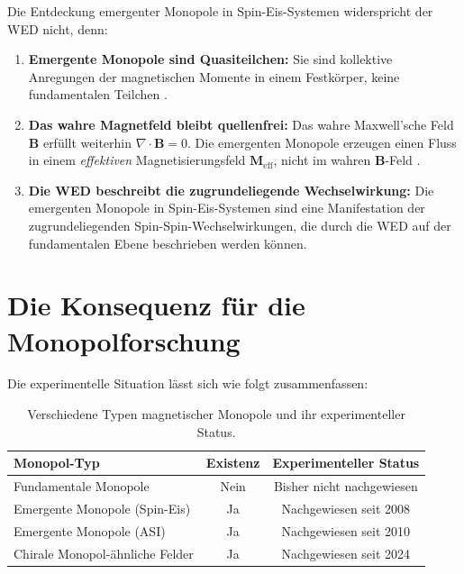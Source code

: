 Die Entdeckung emergenter Monopole in Spin-Eis-Systemen widerspricht der WED nicht, denn:

\begin{enumerate}
    \item \textbf{Emergente Monopole sind Quasiteilchen:} Sie sind kollektive Anregungen der magnetischen Momente in einem Festkörper, keine fundamentalen Teilchen \cite{Castelnovo2008}.
    
    \item \textbf{Das wahre Magnetfeld bleibt quellenfrei:} Das wahre Maxwell'sche Feld $\mathbf{B}$ erfüllt weiterhin $\nabla \cdot \mathbf{B} = 0$. Die emergenten Monopole erzeugen einen Fluss in einem \emph{effektiven} Magnetisierungsfeld $\mathbf{M}_{\text{eff}}$, nicht im wahren $\mathbf{B}$-Feld \cite{Bramwell2009}.
    
    \item \textbf{Die WED beschreibt die zugrundeliegende Wechselwirkung:} Die emergenten Monopole in Spin-Eis-Systemen sind eine Manifestation der zugrundeliegenden Spin-Spin-Wechselwirkungen, die durch die WED auf der fundamentalen Ebene beschrieben werden können.
\end{enumerate}

\section{Die Konsequenz für die Monopolforschung}
\label{app:monopolforschung_konsequenz}

Die experimentelle Situation lässt sich wie folgt zusammenfassen:

\begin{table}[htbp]
\centering
\begin{tabular}{|l|c|c|}
\hline
\textbf{Monopol-Typ} & \textbf{Existenz} & \textbf{Experimenteller Status} \\
\hline
Fundamentale Monopole & Nein & Bisher nicht nachgewiesen \\
Emergente Monopole (Spin-Eis) & Ja & Nachgewiesen seit 2008 \cite{Castelnovo2008} \\
Emergente Monopole (ASI) & Ja & Nachgewiesen seit 2010 \cite{Ladak2010, Mengotti2011} \\
Chirale Monopol-ähnliche Felder & Ja & Nachgewiesen seit 2024 \cite{Small2024} \\
\hline
\end{tabular}
\caption{Verschiedene Typen magnetischer Monopole und ihr experimenteller Status.}
\label{tab:monopole_status}
\end{table}

